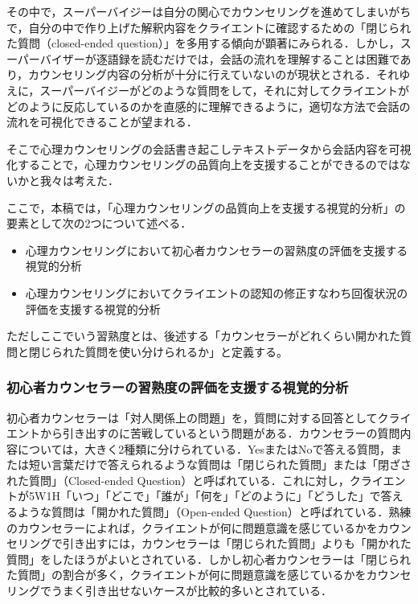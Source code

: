 \documentclass[shuuron]{kuee}
\begin{document}
その中で，スーパーバイジーは自分の関心でカウンセリングを進めてしまいがちで，自分の中で作り上げた解釈内容をクライエントに確認するための「閉じられた質問（closed-ended question）」を多用する傾向が顕著にみられる．しかし，スーパーバイザーが逐語録を読むだけでは，会話の流れを理解することは困難であり，カウンセリング内容の分析が十分に行えていないのが現状とされる．それゆえに，スーパーバイジーがどのような質問をして，それに対してクライエントがどのように反応しているのかを直感的に理解できるように，適切な方法で会話の流れを可視化できることが望まれる．




そこで心理カウンセリングの会話書き起こしテキストデータから会話内容を可視化することで，心理カウンセリングの品質向上を支援することができるのではないかと我々は考えた．

ここで，本稿では，「心理カウンセリングの品質向上を支援する視覚的分析」の要素として次の2つについて述べる．
\begin{itemize}
  \item 心理カウンセリングにおいて初心者カウンセラーの習熟度の評価を支援する視覚的分析
  \item 心理カウンセリングにおいてクライエントの認知の修正すなわち回復状況の評価を支援する視覚的分析
\end{itemize}

ただしここでいう習熟度とは、後述する「カウンセラーがどれくらい開かれた質問と閉じられた質問を使い分けられるか」と定義する。


\subsubsection{初心者カウンセラーの習熟度の評価を支援する視覚的分析}




初心者カウンセラーは「対人関係上の問題」を，質問に対する回答としてクライエントから引き出すのに苦戦しているという問題がある．カウンセラーの質問内容については，大きく2種類に分けられている．YesまたはNoで答える質問，または短い言葉だけで答えられるような質問は「閉じられた質問」または「閉ざされた質問」（Closed-ended Question）と呼ばれている．これに対し，クライエントが5W1H「いつ」「どこで」「誰が」「何を」「どのように」「どうした」で答えるような質問は「開かれた質問」（Open-ended Question）と呼ばれている．熟練のカウンセラーによれば，クライエントが何に問題意識を感じているかをカウンセリングで引き出すには，カウンセラーは「閉じられた質問」よりも「開かれた質問」をしたほうがよいとされている\cite{ivey}．しかし初心者カウンセラーは「閉じられた質問」の割合が多く，クライエントが何に問題意識を感じているかをカウンセリングでうまく引き出せないケースが比較的多いとされている．
\end{document}
